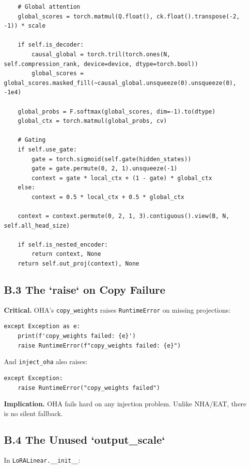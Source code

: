 \begin{lstlisting}
    # Global attention
    global_scores = torch.matmul(Q.float(), ck.float().transpose(-2, -1)) * scale
    
    if self.is_decoder:
        causal_global = torch.tril(torch.ones(N, self.compression_rank, device=device, dtype=torch.bool))
        global_scores = global_scores.masked_fill(~causal_global.unsqueeze(0).unsqueeze(0), -1e4)
    
    global_probs = F.softmax(global_scores, dim=-1).to(dtype)
    global_ctx = torch.matmul(global_probs, cv)
    
    # Gating
    if self.use_gate:
        gate = torch.sigmoid(self.gate(hidden_states))
        gate = gate.permute(0, 2, 1).unsqueeze(-1)
        context = gate * local_ctx + (1 - gate) * global_ctx
    else:
        context = 0.5 * local_ctx + 0.5 * global_ctx
    
    context = context.permute(0, 2, 1, 3).contiguous().view(B, N, self.all_head_size)
    
    if self.is_nested_encoder:
        return context, None
    return self.out_proj(context), None
\end{lstlisting}

\subsection{B.3 The `raise` on Copy Failure}

\textbf{Critical.} OHA's \texttt{copy\_weights} raises \texttt{RuntimeError} on missing projections:

\begin{lstlisting}
except Exception as e:
    print(f'copy_weights failed: {e}')
    raise RuntimeError(f"copy_weights failed: {e}")
\end{lstlisting}

And \texttt{inject\_oha} also raises:

\begin{lstlisting}
except Exception:
    raise RuntimeError("copy_weights failed")
\end{lstlisting}

\textbf{Implication.} OHA fails hard on any injection problem. Unlike NHA/EAT, 
there is no silent fallback.

\subsection{B.4 The Unused `output\_scale`}

In \texttt{LoRALinear.\_\_init\_\_}:

